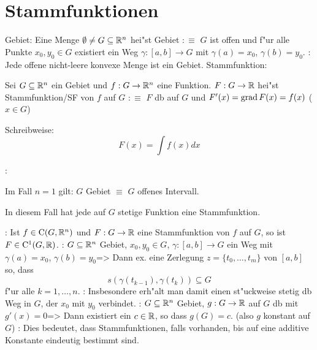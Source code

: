 \section{Stammfunktionen}
 Gebiet:{
  Eine Menge $\emptyset\neq G\subseteq\mathbb R^n$ hei"st Gebiet $:\equiv$
  $G$ ist offen und f"ur alle Punkte $x_0,y_0\in G$ existiert ein Weg
  $\gamma:[a,b]\to G$ mit $\gamma(a)=x_0$, $\gamma(b)=y_0$.
  }
\remark:{
  Jede offene nicht-leere konvexe Menge ist ein Gebiet.
  }
 Stammfunktion:{
  Sei $G\subseteq\mathbb R^n$ ein Gebiet und $f:G\to\mathbb R^n$ eine Funktion.
  $F:G\to\mathbb R$ hei"st Stammfunktion/SF von $f$ auf $G$ $:\equiv$
  $F$ db auf $G$ und $F'(x)=\operatorname{grad} F(x)=f(x)$ ($x\in G$)
  
  Schreibweise:
  \[F(x)=\int f(x) dx
    \]
  }
\remark:{
  Im Fall $n=1$ gilt: $G$ Gebiet $\equiv$ $G$ offenes Intervall.
  
  In diesem Fall hat jede auf $G$ stetige Funktion eine Stammfunktion.
  }
\remark:{
  Ist $f\in{\rm C}(G,\mathbb R^n)$ und $F:G\to\mathbb R$ eine Stammfunktion von $f$
  auf $G$, so ist $F\in{\rm C}^1(G,\mathbb R)$.
  }
\theorem:
  $G\subseteq\mathbb R^n$ Gebiet, $x_0,y_0\in G$, $\gamma:[a,b]\to G$ ein Weg
  mit $\gamma(a)=x_0$, $\gamma(b)=y_0$=>{
  Dann ex. eine Zerlegung $z=\{t_0,\ldots,t_m\}$ von $[a,b]$ so, dass
  \[s(\gamma(t_{k-1}),\gamma(t_k))\subseteq G
    \]
  f"ur alle $k=1,\ldots,n$.
  }
\remark:{
  Insbesondere erh"alt man damit einen st"uckweise stetig db Weg in $G$,
  der $x_0$ mit $y_0$ verbindet.
  }
\theorem:
  $G\subseteq\mathbb R^n$ Gebiet, $g:G\to\mathbb R$ auf $G$ db mit $g'(x)=0$=>{
  Dann existiert ein $c\in\mathbb R$, so dass $g(G)=c$. (also $g$ konstant auf $G$)
  }
\remark:{
  Dies bedeutet, dass Stammfunktionen, falls vorhanden, bis auf eine additive
  Konstante eindeutig bestimmt sind.
  }
